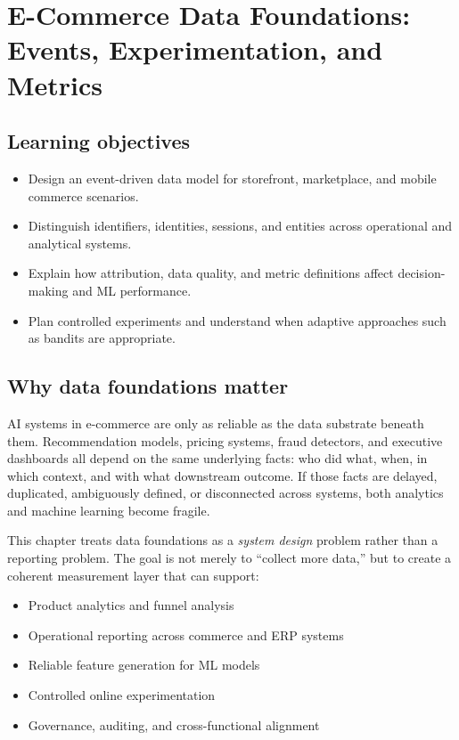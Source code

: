 \chapter[Data Foundations for E-Commerce]{E-Commerce Data Foundations: Events, Experimentation, and Metrics}

\section{Learning objectives}
\begin{itemize}
  \item Design an event-driven data model for storefront, marketplace, and mobile commerce scenarios.
  \item Distinguish identifiers, identities, sessions, and entities across operational and analytical systems.
  \item Explain how attribution, data quality, and metric definitions affect decision-making and ML performance.
  \item Plan controlled experiments and understand when adaptive approaches such as bandits are appropriate.
\end{itemize}

\section{Why data foundations matter}
AI systems in e-commerce are only as reliable as the data substrate beneath them.
Recommendation models, pricing systems, fraud detectors, and executive dashboards all depend on the same underlying facts: who did what, when, in which context, and with what downstream outcome.
If those facts are delayed, duplicated, ambiguously defined, or disconnected across systems, both analytics and machine learning become fragile.

This chapter treats data foundations as a \emph{system design} problem rather than a reporting problem.
The goal is not merely to ``collect more data,'' but to create a coherent measurement layer that can support:
\begin{itemize}
  \item Product analytics and funnel analysis
  \item Operational reporting across commerce and ERP systems
  \item Reliable feature generation for ML models
  \item Controlled online experimentation
  \item Governance, auditing, and cross-functional alignment
\end{itemize}

